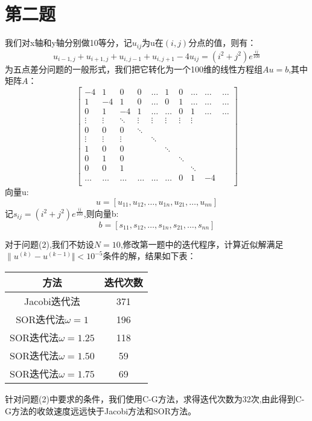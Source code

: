 \documentclass[utf8,a4paper,11pt]{article}
\begin{document}
\section*{第二题}
我们对x轴和y轴分别做10等分，记\(u_{ij}\)为u在\((i,j)\)分点的值，则有：
\[u_{i-1,j}+u_{i+1,j}+ u_{i,j-1}+u_{i,j+1}-4u_{ij}=(i^2+j^2)e^{\frac{ij}{100}}\]
为五点差分问题的一般形式，我们把它转化为一个100维的线性方程组\(Au = b\),其中矩阵\(A\)：
\[\begin{bmatrix}
    -4 & 1 & 0 & 0 & \dots & 1 & 0 & \dots & \dots &\dots\\
    1 & -4 & 1 & 0 & \dots & 0 & 1 & \dots & \dots &\dots\\
    0 & 1 & -4 & 1 & \dots & \dots & 0 & 1 & \dots &\dots\\
    \vdots & \vdots & \ddots & \vdots & \vdots& \vdots& \vdots& \vdots\\
    0 & 0 & 0 &\ddots\\
    \vdots & \vdots & \vdots& &\ddots\\
    1 & 0 & 0 & & &  \ddots\\
    0 & 1 & 0& & & & \ddots\\
    0 & 0 & 1& & & & & \ddots\\
    \dots & \dots & \dots & \dots & \dots & \dots & 0 & 1 & -4 \\

\end{bmatrix}\]
向量u:
\[u =[u_{11}, u_{12}, \dots, u_{1n}, u_{21}, \dots, u_{nn}]\]
记\(s_{ij} = (i^2+j^2)e^{\frac{ij}{100}}\),则向量b:
\[b=[s_{11}, s_{12}, \dots, s_{1n}, s_{21}, \dots, s_{nn}]\]

对于问题(2),我们不妨设\(N = 10\),修改第一题中的迭代程序，计算近似解满足
\(\| u^{(k)} - u^{(k-1)} \Vert < 10^{-5}\)条件的解，结果如下表：
\begin{table}[!ht]
    \begin{tabular*}{\hsize}{@{}@{\extracolsep{\fill}}cc@{}}
    \toprule
    方法 &迭代次数\\
    \midrule
    Jacobi迭代法 & 371\\
    SOR迭代法\(\omega = 1\) & 196 \\
    SOR迭代法\(\omega = 1.25\) & 118\\
    SOR迭代法\(\omega = 1.50\) & 59\\
    SOR迭代法\(\omega = 1.75\) & 69\\
    \bottomrule
    \end{tabular*}
\end{table}
针对问题(2)中要求的条件，我们使用C-G方法，求得迭代次数为32次,由此得到C-G方法的收敛速度远远快于Jacobi方法和SOR方法。
\end{document}
